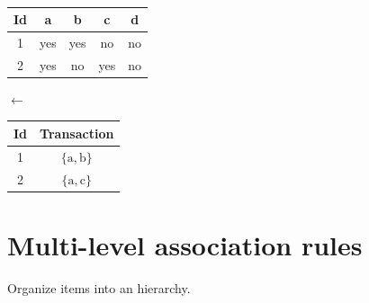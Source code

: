 \begin{description}
        \begin{example} \phantom{}\\
            \begin{minipage}{0.35\textwidth}
                \begin{center}
                    \begin{tabular}{c|c|c|c|c}
                        \textbf{Id} & \textbf{a} & \textbf{b} & \textbf{c} & \textbf{d} \\
                        \hline
                        1 & yes & yes & no & no \\
                        2 & yes & no & yes & no \\
                    \end{tabular}
                \end{center}
            \end{minipage}
            $\leftarrow$
            \begin{minipage}{0.30\textwidth}
                \begin{center}
                    \begin{tabular}{c|c}
                        \textbf{Id} & \textbf{Transaction} \\
                        \hline
                        1 & $\{ \text{a}, \text{b} \}$ \\
                        2 & $\{ \text{a}, \text{c} \}$ \\
                    \end{tabular}
                \end{center}
            \end{minipage}
        \end{example}

\end{description}



\section{Multi-level association rules}
Organize items into an hierarchy.

